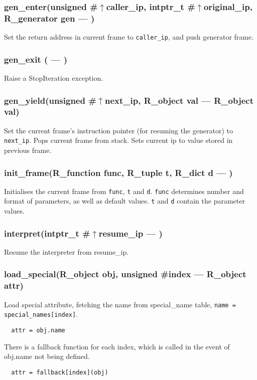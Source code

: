 \subsubsection{gen\_enter(unsigned \#$\uparrow$caller\_ip, intptr\_t \#$\uparrow$original\_ip, R\_generator gen --- )}
\vspace{-1em}Set the return address in current frame to \texttt{caller\_ip}, and push generator frame. \vspace{-1em}
\subsubsection{gen\_exit ( --- ) }
\vspace{-1em}Raise a StopIteration exception. \vspace{-1em}
\subsubsection{gen\_yield(unsigned \#$\uparrow$next\_ip, R\_object val --- R\_object val)}
\vspace{-1em}Set the current frame's instruction pointer (for resuming the generator) to \texttt{next\_ip}. Pops current frame from stack. Sets current ip to value stored in previous frame. \vspace{-1em}
\subsubsection{init\_frame(R\_function func, R\_tuple t, R\_dict d --- )}
\vspace{-1em}Initialises the current frame from \texttt{func}, \texttt{t} and \texttt{d}.  \texttt{func} determines number and format of parameters, as well as default values. \texttt{t} and \texttt{d} contain the parameter values. \vspace{-1em}
\subsubsection{interpret(intptr\_t \#$\uparrow$resume\_ip --- )}
\vspace{-1em}Resume the interpreter from resume\_ip. \vspace{-1em}
\subsubsection{load\_special(R\_object obj, unsigned \#index --- R\_object attr)}
\vspace{-1em}Load special attribute, fetching the name from special\_name table, \texttt{name = special\_names[index]}.  \vspace{-1em}\begin{verbatim}
  attr = obj.name
\end{verbatim}
\vspace{-1em}There is a fallback function for each index, which is called in the event of obj.name not being defined. \vspace{-1em}\begin{verbatim}
  attr = fallback[index](obj)
\end{verbatim}
\vspace{-1em}\vspace{-1em}
